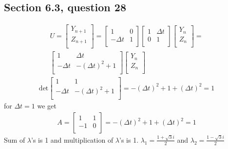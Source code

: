 \documentclass[a4paper,11pt]{article}
\begin{document}
\subsection*{Section 6.3, question 28}
\begin{align*}
U = 
\begin{bmatrix}
Y_{n+1} \\
Z_{n+1} \\
\end{bmatrix}
=
\begin{bmatrix}
1 & 0 \\
-\Delta t & 1 \\
\end{bmatrix}
\begin{bmatrix}
1 & \Delta t \\
0 & 1 \\
\end{bmatrix}
\begin{bmatrix}
Y_n \\
Z_n \\
\end{bmatrix} = \\
\begin{bmatrix}
1 & \Delta t \\
-\Delta t & -{(\Delta t)}^2+1 \\
\end{bmatrix}  
\begin{bmatrix}
Y_n \\
Z_n \\
\end{bmatrix} 
\end{align*}
\begin{align*}
\text{det}
\begin{bmatrix}
1 & 1 \\
-\Delta t & -{(\Delta t)}^2+1 \\
\end{bmatrix}  =
-{(\Delta t)}^2+1+{(\Delta t)}^2=1
\end{align*}
for $\Delta t=1$ we get
\begin{align*}
A = 
\begin{bmatrix}
1 & 1 \\
-1 & 0 \\
\end{bmatrix}  =
-{(\Delta t)}^2+1+{(\Delta t)}^2=1
\end{align*}
Sum of $\lambda$'s is 1 and multiplication of $\lambda$'s is 1.
$\lambda_1 = \frac{1+\sqrt{3}i}{2}$ and $\lambda_2 = \frac{1-\sqrt{3}i}{2}$
\end{document}
